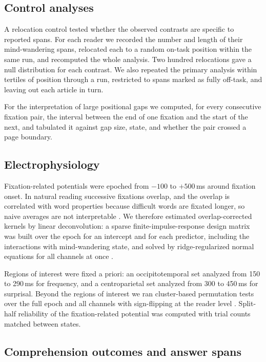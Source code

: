 \documentclass[11pt]{article}
\begin{document}
\subsection{Control analyses}

A relocation control tested whether the observed contrasts are specific to reported spans. For
each reader we recorded the number and length of their mind-wandering spans, relocated each to
a random on-task position within the same run, and recomputed the whole analysis. Two hundred
relocations gave a null distribution for each contrast. We also repeated the primary analysis
within tertiles of position through a run, restricted to spans marked as fully off-task, and
leaving out each article in turn.

For the interpretation of large positional gaps we computed, for every consecutive fixation
pair, the interval between the end of one fixation and the start of the next, and tabulated it
against gap size, state, and whether the pair crossed a page boundary.

\subsection{Electrophysiology}

Fixation-related potentials were epoched from $-100$ to $+500$\,ms around fixation onset. In
natural reading successive fixations overlap, and the overlap is correlated with word
properties because difficult words are fixated longer, so naive averages are not
interpretable \citep{dimigen2011,dimigen2021}. We therefore estimated overlap-corrected
kernels by linear deconvolution: a sparse finite-impulse-response design matrix was built over
the epoch for an intercept and for each predictor, including the interactions with
mind-wandering state, and solved by ridge-regularized normal equations for all channels at
once \citep{smith2015,ehinger2019}.

Regions of interest were fixed a priori: an occipitotemporal set analyzed from 150 to 290\,ms
for frequency, and a centroparietal set analyzed from 300 to 450\,ms for surprisal. Beyond the
regions of interest we ran cluster-based permutation tests over the full epoch and all channels
with sign-flipping at the reader level \citep{maris2007}. Split-half reliability of the
fixation-related potential was computed with trial counts matched between states.

\subsection{Comprehension outcomes and answer spans}
\end{document}
